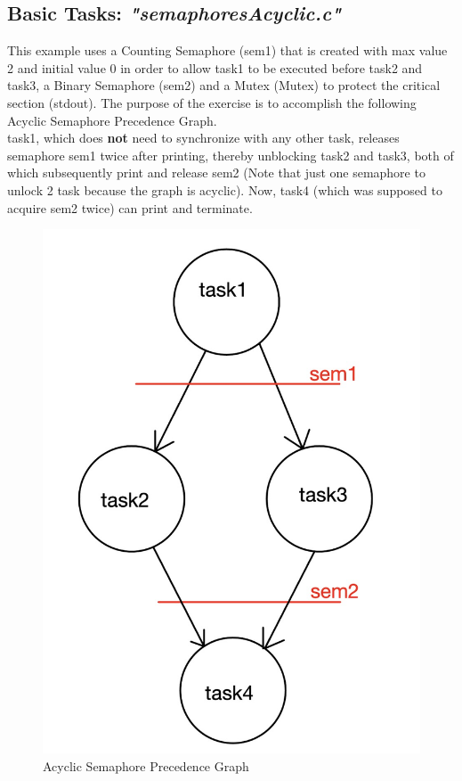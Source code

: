 \documentclass{article}
\begin{document}
\subsection{Basic Tasks: \textit{"semaphoresAcyclic.c"}}
\begin{minipage}[t]{0.6\textwidth}
    This example uses a Counting Semaphore (sem1) that is created with max value 2 and initial value 0 in order to allow task1 to be executed before task2 and task3, a Binary Semaphore (sem2) and a Mutex (Mutex) to protect the critical section (stdout). The purpose of the exercise is to accomplish the following Acyclic Semaphore Precedence Graph.\\[0.1cm]
    task1, which does \textbf{not} need to synchronize with any other task, releases semaphore sem1 twice after printing, thereby unblocking task2 and task3, both of which subsequently print and release sem2 (Note that just one semaphore to unlock 2 task because the graph is acyclic). Now, task4 (which was supposed to acquire sem2 twice) can print and terminate.
\end{minipage}
\begin{minipage}[t]{0.4\textwidth}\vspace{-50pt}
    \begin{figure}[H]
        \centering
        \includegraphics[width=0.65\linewidth]{acyclic.jpeg}
        \caption{Acyclic Semaphore Precedence Graph}
    \end{figure}\noindent
\end{minipage}
\end{document}
